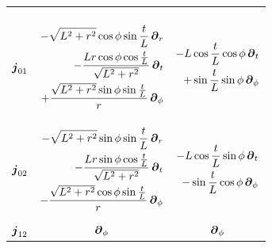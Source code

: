 \documentclass[a4paper,12pt]{article}
\begin{document}
\begin{table}[H]
\begin{adjustbox}{width=0.80\textwidth}
\begin{tabular}{ccc}
{\begin{equation*}
\begin{split}
                        \end{split}
                     \end{equation*}} \\
                     $\boldsymbol{j}_{0 1}$ & \parbox{0.3\textwidth}{\begin{equation*}
                        \begin{split}
                           -\sqrt{L^2+r^2} \cos\phi \sin \frac{t}{L} \, \boldsymbol{\partial}_r \\ - \frac{L r \cos\phi \cos \frac{t}{L}}{\sqrt{L^2+r^2}} \, \boldsymbol{\partial}_t \\ + \frac{\sqrt{L^2+r^2} \sin\phi \sin \frac{t}{L}}{r} \, \boldsymbol{\partial}_\phi 
                        \end{split}
                     \end{equation*}} & \parbox{0.3\textwidth}{\begin{equation*}
                        \begin{split}
                           - L \cos\frac{t}{L} \cos\phi \, \boldsymbol{\partial}_t \\ + \sin\frac{t}{L} \sin\phi \, \boldsymbol{\partial}_\phi 
                        \end{split}
                     \end{equation*}} \\
                     $\boldsymbol{j}_{0 2}$ & \parbox{0.3\textwidth}{\begin{equation*}
                        \begin{split}
                           -\sqrt{L^2+r^2} \sin\phi \sin \frac{t}{L} \, \boldsymbol{\partial}_r \\ - \frac{L r \sin\phi \cos \frac{t}{L}}{\sqrt{L^2+r^2}} \, \boldsymbol{\partial}_t \\ - \frac{\sqrt{L^2+r^2} \cos\phi \sin \frac{t}{L}}{r} \, \boldsymbol{\partial}_\phi 
                        \end{split}
                     \end{equation*}} & \parbox{0.3\textwidth}{\begin{equation*}
                        \begin{split}
                           - L \cos\frac{t}{L} \sin\phi \, \boldsymbol{\partial}_t \\ - \sin\frac{t}{L} \cos\phi \, \boldsymbol{\partial}_\phi 
                        \end{split}
                     \end{equation*}} \\
                     $\boldsymbol{j}_{1 2}$ & $\boldsymbol{\partial}_\phi$ & $\boldsymbol{\partial}_\phi$ \\
                  \bottomrule
               \end{tabular}
            \end{adjustbox}
         \end{table}
\end{document}
